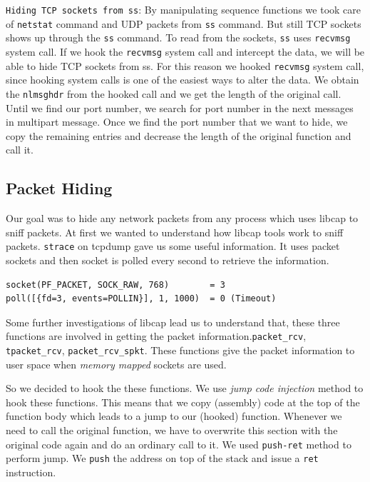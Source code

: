 \documentclass[10pt, letterpaper]{scrartcl}
\begin{document}
\texttt{Hiding TCP sockets from ss}: By manipulating sequence functions we took care of \texttt{netstat} 
command and UDP packets from \texttt{ss} command. But still TCP sockets shows up through the \texttt{ss} command.
To read from the sockets, \texttt{ss} uses \texttt{recvmsg} system call. 
If we hook the \texttt{recvmsg} system call and intercept the data, we will be able to hide TCP sockets from ss. 
For this reason we hooked \texttt{recvmsg} system call, 
since hooking system calls is one of the easiest ways to alter the data.
We obtain the \texttt{nlmsghdr} from the hooked call and we get the length of the original call.
Until we find our port number, we search for port number in the next messages in multipart message. 
Once we find the port number that we want to hide, 
we copy the remaining entries and decrease the length of the original function and call it.


\subsection{Packet Hiding}
Our goal was to hide any network packets from any process which uses libcap to  sniff packets.
At first we wanted to understand how libcap tools work to sniff packets. \texttt{strace} on tcpdump gave us some useful information. It uses packet sockets and then socket is polled every second to retrieve the information.   

\begin{verbatim}
socket(PF_PACKET, SOCK_RAW, 768)        = 3
poll([{fd=3, events=POLLIN}], 1, 1000)  = 0 (Timeout)
\end{verbatim} 

Some further investigations of libcap lead us to understand that, these three functions are involved in getting the packet information.\texttt{packet\_rcv}, \texttt{tpacket\_rcv}, \texttt{packet\_rcv\_spkt}. These functions give the packet information to user space when {\em memory mapped} sockets are used.

So we decided to hook the these functions. 
We use {\em jump code injection} method to hook these functions. This means that we copy (assembly)
code at the top of the function body which leads to a jump to our (hooked) function. Whenever we need to call
the original function, we have to overwrite this section with the original code again and do an ordinary call to
it. We used \texttt{push-ret} method to perform jump. 
We \texttt{push} the address on top of the stack and issue a \texttt{ret} instruction.
\end{document}
